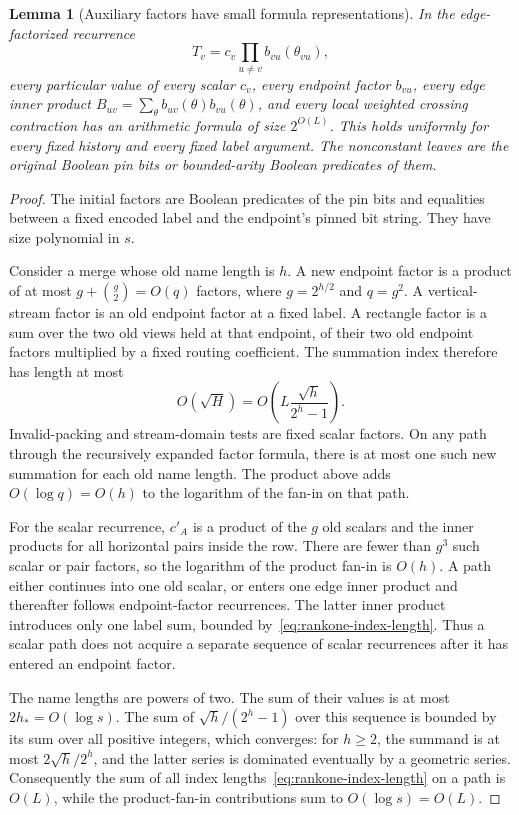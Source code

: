 \documentclass[11pt]{article}
\newtheorem{lemma}[theorem]{Lemma}
\theoremstyle{definition}
\theoremstyle{remark}
\begin{document}
\begin{lemma}[Auxiliary factors have small formula representations]
\label{lem:rankone-factor-formulas}
In the edge-factorized recurrence
\[
 T_v=c_v\prod_{u\ne v}b_{vu}(\theta_{vu}),
\]
every particular value of every scalar $c_v$, every endpoint
factor $b_{vu}$, every edge inner product
$B_{uv}=\sum_\theta b_{uv}(\theta)b_{vu}(\theta)$,
and every local weighted crossing contraction has an arithmetic
formula of size $2^{O(L)}$. This holds uniformly for every
fixed history and every fixed label argument. The nonconstant
leaves are the original Boolean pin bits or bounded-arity
Boolean predicates of them.
\end{lemma}
\begin{proof}
The initial factors are Boolean predicates of the pin bits and
equalities between a fixed encoded label and the endpoint's pinned
bit string. They have size polynomial in $s$.

Consider a merge whose old name length is $h$. A new endpoint
factor is a product of at most $g+\binom g2=O(q)$ factors,
where $g=2^{h/2}$ and $q=g^2$. A vertical-stream factor is an
old endpoint factor at a fixed label. A rectangle factor is a sum
over the two old views held at that endpoint, of their two old
endpoint factors multiplied by a fixed routing coefficient.
The summation index therefore has length at most
\[
 O(\sqrt H)
 =O\!\left(L\frac{\sqrt h}{2^h-1}\right).
 \tag{\thesection.1}\label{eq:rankone-index-length}
\]
Invalid-packing and stream-domain tests are fixed scalar factors.
On any path through the recursively expanded factor formula,
there is at most one such new summation for each old name length.
The product above adds $O(\log q)=O(h)$ to the logarithm of
the fan-in on that path.

For the scalar recurrence, $c'_A$ is a product of the $g$ old
scalars and the inner products for all horizontal pairs inside the
row. There are fewer than $g^3$ such scalar or pair factors, so
the logarithm of the product fan-in is $O(h)$. A path either
continues into one old scalar, or enters one edge inner product
and thereafter follows endpoint-factor recurrences. The latter
inner product introduces only one label sum, bounded
by~\eqref{eq:rankone-index-length}.
Thus a scalar path does not acquire a separate sequence of
scalar recurrences after it has entered an endpoint factor.

The name lengths are powers of two. The sum of their values is
at most $2h_*=O(\log s)$. The sum of
$\sqrt h/(2^h-1)$ over this sequence is bounded by its sum
over all positive integers, which converges: for $h\ge2$,
the summand is at most $2\sqrt h/2^h$, and the latter
series is dominated eventually by a geometric series.
Consequently the sum of all index lengths~\eqref{eq:rankone-index-length}
on a path is
$O(L)$, while the product-fan-in contributions sum to
$O(\log s)=O(L)$.


\end{proof}
\end{document}
